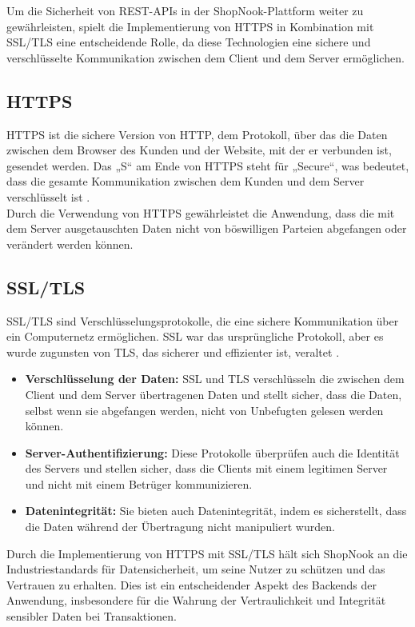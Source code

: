 Um die Sicherheit von REST-APIs in der ShopNook-Plattform weiter zu gewährleisten, spielt die Implementierung von HTTPS in Kombination mit SSL/TLS eine entscheidende Rolle, da diese Technologien eine sichere und verschlüsselte Kommunikation zwischen dem Client und dem Server ermöglichen.

\subsection{HTTPS}

HTTPS ist die sichere Version von HTTP, dem Protokoll, über das die Daten zwischen dem Browser des Kunden und der Website, mit der er verbunden ist, gesendet werden. Das „S“ am Ende von HTTPS steht für „Secure“, was bedeutet, dass die gesamte Kommunikation zwischen dem Kunden und dem Server verschlüsselt ist \cite{HTTPS:2024}.\\
Durch die Verwendung von HTTPS gewährleistet die Anwendung, dass die mit dem Server ausgetauschten Daten nicht von böswilligen Parteien abgefangen oder verändert werden können.

\subsection{SSL/TLS}

SSL/TLS sind Verschlüsselungsprotokolle, die eine sichere Kommunikation über ein Computernetz ermöglichen. SSL war das ursprüngliche Protokoll, aber es wurde zugunsten von TLS, das sicherer und effizienter ist, veraltet \cite{SSL/TLS:2023}.

\begin{itemize}
	\item \textbf{Verschlüsselung der Daten:} SSL und TLS verschlüsseln die zwischen dem Client und dem Server übertragenen Daten und stellt sicher, dass die Daten, selbst wenn sie abgefangen werden, nicht von Unbefugten gelesen werden können.
	\item \textbf{Server-Authentifizierung:} Diese Protokolle überprüfen auch die Identität des Servers und stellen sicher, dass die Clients mit einem legitimen Server und nicht mit einem Betrüger kommunizieren.
	\item \textbf{Datenintegrität:} Sie bieten auch Datenintegrität, indem es sicherstellt, dass die Daten während der Übertragung nicht manipuliert wurden.
\end{itemize}

Durch die Implementierung von HTTPS mit SSL/TLS hält sich ShopNook an die Industriestandards für Datensicherheit, um seine Nutzer zu schützen und das Vertrauen zu erhalten. Dies ist ein entscheidender Aspekt des Backends der Anwendung, insbesondere für die Wahrung der Vertraulichkeit und Integrität sensibler Daten bei Transaktionen.

